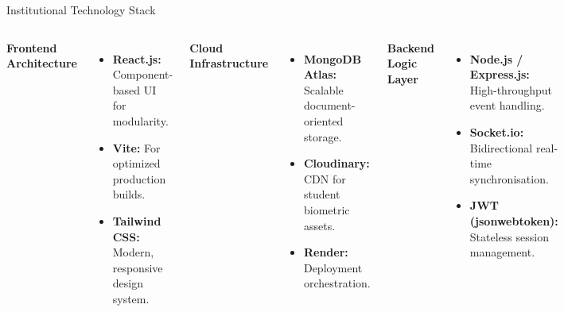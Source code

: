 \documentclass[10pt, aspectratio=169]{beamer}
\begin{document}
\begin{frame}{Institutional Technology Stack}
    \small
    \begin{columns}[t]
        \textbf{Frontend Architecture}
        \begin{itemize}
            \item \textbf{React.js:} Component-based UI for modularity.
            \item \textbf{Vite:} For optimized production builds.
            \item \textbf{Tailwind CSS:} Modern, responsive design system.
        \end{itemize}
        \vspace{0.1cm}
        \textbf{Cloud Infrastructure}
        \begin{itemize}
            \item \textbf{MongoDB Atlas:} Scalable document-oriented storage.
            \item \textbf{Cloudinary:} CDN for student biometric assets.
            \item \textbf{Render:} Deployment orchestration.
        \end{itemize}
        \textbf{Backend Logic Layer}
        \begin{itemize}
            \item \textbf{Node.js / Express.js:} High-throughput event handling.
            \item \textbf{Socket.io:} Bidirectional real-time synchronisation.
            \item \textbf{JWT (jsonwebtoken):} Stateless session management.
        \end{itemize}
    \end{columns}
\end{frame}

\end{document}
